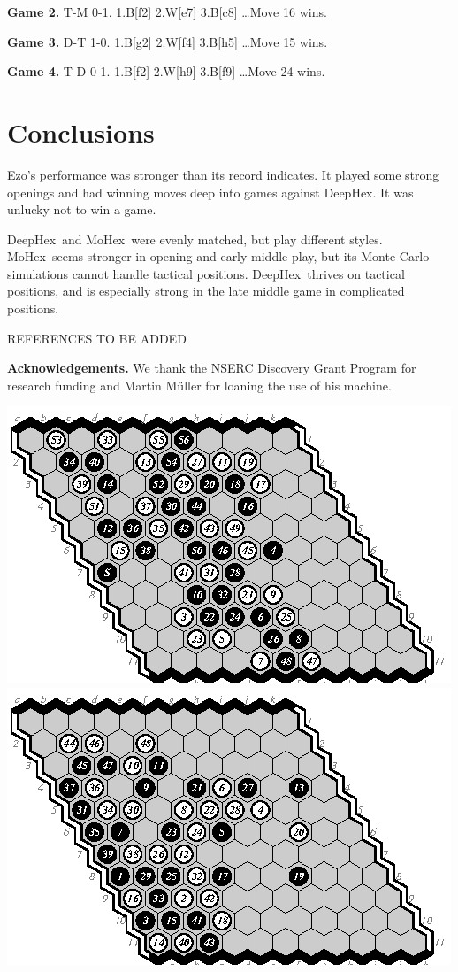 \documentclass{icga}
\def\Dx{\mbox{\sc DeepHex}}
\def\Eo{\mbox{\sc Ezo}}
\def\Mx{\mbox{\sc MoHex}}
\def\TV{\mbox{\sc TV}} %
\begin{document}
{\bf Game 2.}
{\sc T-M 0-1.}
1.B[f2] 2.W[e7] 3.B[c8] \ldots \hfill Move 16 wins.

{\bf Game 3.}
{\sc D-T 1-0.}
1.B[g2] 2.W[f4] 3.B[h5] \ldots \hfill Move 15 wins.

{\bf Game 4.}
{\sc T-D 0-1.}
1.B[f2] 2.W[h9] 3.B[f9] \ldots \hfill Move 24 wins.

\section{Conclusions}
\Eo{}'s performance was stronger than its record indicates. 
It played some strong openings and had winning moves deep
into games against \Dx.
It was unlucky not to win a game.

\Dx\ and \Mx\ were evenly matched, but play different styles.
\Mx\ seems stronger in opening and early middle play,
but its Monte Carlo simulations cannot handle tactical positions.
\Dx\ thrives on tactical positions, and is especially
strong in the late middle game in complicated positions.

REFERENCES TO BE ADDED

{\bf Acknowledgements.}
We thank the NSERC Discovery Grant Program for research funding
and Martin M\"{u}ller for loaning the use of his machine.


\includegraphics[scale=1.3]{1e-m.eps}\hspace*{-1cm}\includegraphics[scale=1.3]{2d-e.eps}
\end{document}
